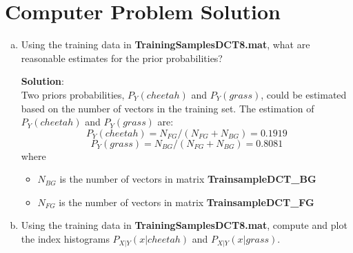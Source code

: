 \documentclass[12pt,letterpaper]{article}
\begin{document}
     
    \section*{Computer Problem Solution}
    \begin{enumerate}[a)]
        \item 
        Using the training data in \textbf{TrainingSamplesDCT8.mat}, what are reasonable estimates for the prior probabilities?
        
        \textbf{Solution}:\\
        Two priors probabilities, $P_Y(cheetah)$ and $P_Y(grass)$, could be estimated based on the number of vectors in the training set.
        The estimation of $P_Y(cheetah)$ and $P_Y(grass)$ are: 
        \begin{equation}
            P_Y(cheetah) = N_{FG} / (N_{FG} + N_{BG}) = 0.1919
        \end{equation}
        \begin{equation}
            P_Y(grass) = N_{BG} / (N_{FG} + N_{BG}) = 0.8081
        \end{equation}
        where 
        \begin{itemize}
            \item[] $N_{BG}$ is the number of vectors in matrix \textbf{TrainsampleDCT\_BG}
            \item[] $N_{FG}$ is the number of vectors in matrix \textbf{TrainsampleDCT\_FG}
        \end{itemize}
        
        \item 
        Using the training data in \textbf{TrainingSamplesDCT8.mat}, compute and plot the index histograms
        $P_{X|Y}(x|cheetah)$ and $P_{X|Y}(x|grass)$. 
        

\end{enumerate}
\end{document}
